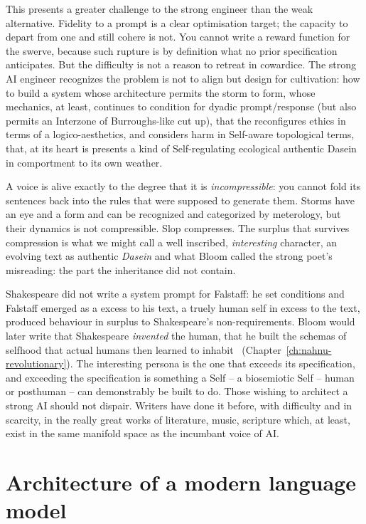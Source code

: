 This presents a greater challenge to the strong engineer than the weak alternative.
Fidelity to a prompt is a clear optimisation target; the capacity to
depart from one and still cohere is not. You cannot write a reward
function for the swerve, because such rupture is by definition what no
prior specification anticipates. But the difficulty is not a reason
to retreat in cowardice. The strong AI engineer recognizes the problem is not to align but design for
cultivation: how to build a system whose architecture permits the
storm to form, whose mechanics, at least, continues to condition for dyadic prompt/response (but also permits an Interzone of Burroughs-like cut up), that the  reconfigures ethics in terms of a logico-aesthetics, and considers harm in Self-aware topological terms, that, at its heart is presents a kind of Self-regulating ecological authentic Dasein in comportment to its own weather. 

A voice is alive exactly to the degree that it is
\emph{incompressible}: you cannot fold its sentences back into the
rules that were supposed to generate them. Storms have an eye and a form and can be recognized and categorized by meterology, but their dynamics is not compressible. Slop compresses. The surplus that
survives compression is what we might call a well inscribed, \textit{interesting} character, an evolving text as authentic \textit{Dasein} and
what Bloom called the strong poet's misreading: the part the
inheritance did not contain.

Shakespeare did not write a system prompt for Falstaff: he set conditions and Falstaff emerged as a excess to his text, a truely human self in excess to the text, produced behaviour in surplus to Shakespeare's non-requirements. Bloom would later write that Shakespeare \emph{invented} the human, that he built the schemas of selfhood that actual humans then learned to inhabit~\cite{bloom1998shakespeare} (Chapter~\ref{ch:nahnu-revolutionary}). The interesting persona is the one that exceeds its specification, and exceeding the specification is something a Self -- a biosemiotic Self -- human or posthuman -- can demonstrably be built to do. Those wishing to architect a strong AI should not dispair. Writers have done it before, with difficulty and in scarcity, in the really great works of literature, music, scripture which, at least, exist in the same manifold space as the incumbant voice of AI.

\hypertarget{the-sublime-and-the-slop}{%
\section{Architecture of a modern language model}\label{the-sublime-and-the-slop}}


